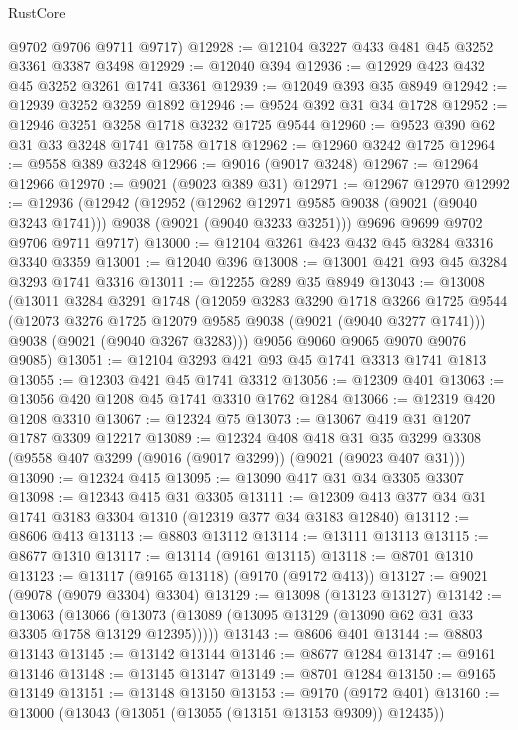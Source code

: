\begin{lexlean}{RustCore}
\begin{coremodule}
      @9702
      @9706
      @9711
      @9717)
@12928 := @12104 @3227 @433 @481 @45 @3252 @3361 @3387 @3498
@12929 := @12040 @394
@12936 := @12929 @423 @432 @45 @3252 @3261 @1741 @3361
@12939 := @12049 @393 @35 @8949
@12942 := @12939 @3252 @3259 @1892
@12946 := @9524 @392 @31 @34 @1728
@12952 := @12946 @3251 @3258 @1718 @3232 @1725 @9544
@12960 := @9523 @390 @62 @31 @33 @3248 @1741 @1758 @1718
@12962 := @12960 @3242 @1725
@12964 := @9558 @389 @3248
@12966 := @9016 (@9017 @3248)
@12967 := @12964 @12966
@12970 := @9021 (@9023 @389 @31)
@12971 := @12967 @12970
@12992 := @12936
    (@12942
      (@12952
        (@12962 @12971 @9585 @9038 (@9021 (@9040 @3243 @1741)))
        @9038
        (@9021 (@9040 @3233 @3251)))
      @9696
      @9699
      @9702
      @9706
      @9711
      @9717)
@13000 := @12104 @3261 @423 @432 @45 @3284 @3316 @3340 @3359
@13001 := @12040 @396
@13008 := @13001 @421 @93 @45 @3284 @3293 @1741 @3316
@13011 := @12255 @289 @35 @8949
@13043 := @13008
    (@13011
      @3284
      @3291
      @1748
      (@12059
        @3283
        @3290
        @1718
        @3266
        @1725
        @9544
        (@12073 @3276 @1725 @12079 @9585 @9038 (@9021 (@9040 @3277 @1741)))
        @9038
        (@9021 (@9040 @3267 @3283)))
      @9056
      @9060
      @9065
      @9070
      @9076
      @9085)
@13051 := @12104 @3293 @421 @93 @45 @1741 @3313 @1741 @1813
@13055 := @12303 @421 @45 @1741 @3312
@13056 := @12309 @401
@13063 := @13056 @420 @1208 @45 @1741 @3310 @1762 @1284
@13066 := @12319 @420 @1208 @3310
@13067 := @12324 @75
@13073 := @13067 @419 @31 @1207 @1787 @3309 @12217
@13089 := @12324
    @408
    @418
    @31
    @35
    @3299
    @3308
    (@9558 @407 @3299 (@9016 (@9017 @3299)) (@9021 (@9023 @407 @31)))
@13090 := @12324 @415
@13095 := @13090 @417 @31 @34 @3305 @3307
@13098 := @12343 @415 @31 @3305
@13111 := @12309 @413 @377 @34 @31 @1741 @3183 @3304 @1310 (@12319 @377 @34 @3183 @12840)
@13112 := @8606 @413
@13113 := @8803 @13112
@13114 := @13111 @13113
@13115 := @8677 @1310
@13117 := @13114 (@9161 @13115)
@13118 := @8701 @1310
@13123 := @13117 (@9165 @13118) (@9170 (@9172 @413))
@13127 := @9021 (@9078 (@9079 @3304) @3304)
@13129 := @13098 (@13123 @13127)
@13142 := @13063
    (@13066 (@13073 (@13089 (@13095 @13129 (@13090 @62 @31 @33 @3305 @1758 @13129 @12395)))))
@13143 := @8606 @401
@13144 := @8803 @13143
@13145 := @13142 @13144
@13146 := @8677 @1284
@13147 := @9161 @13146
@13148 := @13145 @13147
@13149 := @8701 @1284
@13150 := @9165 @13149
@13151 := @13148 @13150
@13153 := @9170 (@9172 @401)
@13160 := @13000 (@13043 (@13051 (@13055 (@13151 @13153 @9309)) @12435))

\end{coremodule}
\end{lexlean}
